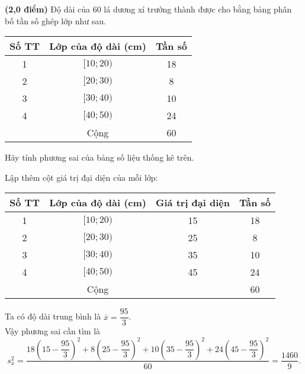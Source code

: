 \begin{bt}%
	\textbf{(2,0 điểm)}
	Độ dài của 60 lá dương xỉ trưởng thành được cho bằng bảng phân bố tần số ghép lớp như sau.
	\begin{center}
		\begin{tabular}{|c|c|c|}\hline
			{Số TT}&{Lớp của độ dài (cm)}&{Tần số}\\
			\hline
			{1}&{$[10;20)$}&{18}\\
			\hline
			{2}&{$[20;30)$}&{8}\\
			\hline
			{3}&{$[30;40)$}&{10}\\
			\hline
			{4}&{$[40;50)$}&{24}\\
			\hline
			{}&{Cộng}&{60}\\
			\hline
		\end{tabular}
	\end{center}
	Hãy tính phương sai của bảng số liệu thống kê trên.
	\loigiai
	{Lập thêm cột giá trị đại diện của mỗi lớp:
		\begin{center}
			\begin{tabular}{|c|c|c|c|}\hline
				{Số TT}&{Lớp của độ dài (cm)}&{Giá trị đại diện}&{Tần số}\\
				\hline
				{1}&{$[10;20)$}&{15}&{18}\\
				\hline
				{2}&{$[20;30)$}&{25}&{8}\\
				\hline
				{3}&{$[30;40)$}&{35}&{10}\\
				\hline
				{4}&{$[40;50)$}&{45}&{24}\\
				\hline
				{}&{Cộng}&{}&{60}\\
				\hline
			\end{tabular}
		\end{center}
		Ta có độ dài trung bình là $\bar{x}=\dfrac{95}{3}$.\\
		Vậy phương sai cần tìm là $$s_x^2=\dfrac{18\left(15-\dfrac{95}{3}\right)^2+8\left(25-\dfrac{95}{3}\right)^2+10\left(35-\dfrac{95}{3}\right)^2+24\left(45-\dfrac{95}{3}\right)^2}{60}= \dfrac{1460}{9}  .$$
	}
\end{bt}



